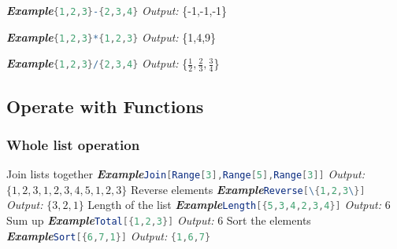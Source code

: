 \documentclass[a4paper]{book}
\begin{document}
\noindent\emph{\textbf{Example}}\quad \lstinline[language=Mathematica]|{1,2,3}-{2,3,4}| \hspace{\fill}\emph{Output:} \{-1,-1,-1\}

\noindent\emph{\textbf{Example}}\quad \lstinline[language=Mathematica]|{1,2,3}*{1,2,3}| \hspace{\fill}\emph{Output:} \{1,4,9\}

\noindent\emph{\textbf{Example}}\quad \lstinline[language=Mathematica]|{1,2,3}/{2,3,4}| \hspace{\fill}\emph{Output:} \{$\frac{1}{2},\frac{2}{3},\frac{3}{4}$\}

\subsection{Operate with Functions}

\subsubsection{Whole list operation}

\noindent Join lists together
\newline
\noindent\emph{\textbf{Example}}\quad \lstinline[language=Mathematica]|Join[Range[3],Range[5],Range[3]]| \hspace{\fill}\emph{Output:} $\{1,2,3,1,2,3,4,5,1,2,3\}$
\newline
\newline
\noindent Reverse elements
\newline
\noindent\emph{\textbf{Example}}\quad \lstinline[language=Mathematica]|Reverse[\{1,2,3\}]| \hspace{\fill}\emph{Output:} $\{3,2,1\}$
\newline
\newline
\noindent Length of the list
\newline
\noindent\emph{\textbf{Example}}\quad \lstinline[language=Mathematica]|Length[{5,3,4,2,3,4}]| \hspace{\fill}\emph{Output:} $6$
\newline
\newline
\noindent Sum up
\newline
\noindent\emph{\textbf{Example}}\quad \lstinline[language=Mathematica]|Total[{1,2,3}]| \hspace{\fill}\emph{Output:} $6$
\newline
\newline
\noindent Sort the elements
\newline
\noindent\emph{\textbf{Example}}\quad \lstinline[language=Mathematica]|Sort[{6,7,1}]| \hspace{\fill}\emph{Output:} \lstinline[language=Mathematica]|{1,6,7}| 
\end{document}
